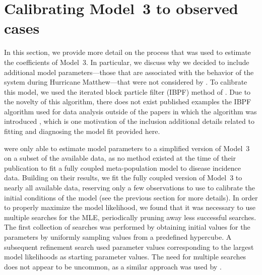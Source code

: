 
\section{Calibrating Model~3 to observed cases}\label{sec:mod3Cal}









In this section, we provide more detail on the process that was used to estimate the coefficients of Model~3.
In particular, we discuss why we decided to include additional model parameters---those that are associated with the behavior of the system during Hurricane Matthew---that were not considered by \cite{lee20}.
To calibrate this model, we used the iterated block particle filter (IBPF) method of \cite{ionides22}.
Due to the novelty of this algorithm, there does not exist published examples the IBPF algorithm used for data analysis outside of the papers in which the algorithm was introduced \citep{ning21ibpf,ionides22}, which is one motivation of the inclusion additional details related to fitting and diagnosing the model fit provided here.

\cite{lee20} were only able to estimate model parameters to a simplified version of Model~3 on a subset of the available data, as no method existed at the time of their publication to fit a fully coupled meta-population model to disease incidence data.
Building on their results, we fit the fully coupled version of Model~3 to nearly all available data, reserving only a few observations to use to calibrate the initial conditions of the model (see the previous section for more details).
In order to properly maximize the model likelihood, we found that it was necessary to use multiple searches for the MLE, periodically pruning away less successful searches.
The first collection of searches was performed by obtaining initial values for the parameters by uniformly sampling values from a predefined hypercube.
A subsequent refinement search used parameter values corresponding to the largest model likelihoods as starting parameter values.
The need for multiple searches does not appear to be uncommon, as a similar approach was used by \cite{ionides22}.

